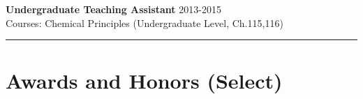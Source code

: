 \documentclass[letterpaper]{article}
\renewenvironment{itemize}{
  \begin{list}{}{
    \setlength{\leftmargin}{1.5em}
  }
}{
  \end{list}
}
\begin{document}
\begin{itemize}
\item \textbf{Undergraduate Teaching Assistant} \hfill 2013-2015\\
      Courses: Chemical Principles (Undergraduate Level, Ch.115,116)



\end{itemize}

\vspace{0.1in}
\hrule

\section*{Awards and Honors (Select)}
\end{document}
